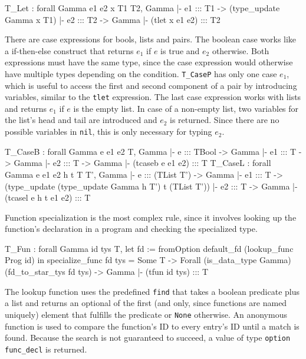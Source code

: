 \documentclass[paper = a4, fleqn, twoside]{scrreprt}
\newcommand{\coqinline}[1]{\texttt{#1}}
\begin{document}
\begin{coqcode}
T_Let : forall Gamma e1 e2 x T1 T2,
          Gamma |- e1 ::: T1 -> (type_update Gamma x T1) |- e2 ::: T2 ->
          Gamma |- (tlet x e1 e2) ::: T2
\end{coqcode}
There are case expressions for bools, lists and pairs. The boolean case works like a if-then-else construct that returns $e_{1}$ if $e$ is true and $e_{2}$ otherwise. Both expressions must have the same type, since the case expression would otherwise have multiple types depending on the condition. \coqinline{T_CaseP} has only one case $e_{1}$, which is useful to access the first and second component of a pair by introducing variables, similar to the \coqinline{tlet} expression. The last case expression works with lists and returns $e_{1}$ if $e$ is the empty list. In case of a non-empty list, two variables for the list's head and tail are introduced and $e_{2}$ is returned. Since there are no possible variables in \coqinline{nil}, this is only necessary for typing $e_{2}$.
\begin{coqcode}
T_CaseB : forall Gamma e e1 e2 T,
            Gamma |- e ::: TBool -> Gamma |- e1 ::: T -> Gamma |- e2 ::: T ->
            Gamma |- (tcaseb e e1 e2) ::: T
T_CaseL : forall Gamma e e1 e2 h t T T',
            Gamma |- e ::: (TList T') -> Gamma |- e1 ::: T ->
            (type_update (type_update Gamma h T') t (TList T')) |- e2 ::: T ->
            Gamma |- (tcasel e h t e1 e2) ::: T
\end{coqcode}
Function specialization is the most complex rule, since it involves looking up the function's declaration in a program and checking the specialized type.
\begin{coqcode}
T_Fun : forall Gamma id tys T,
          let fd := fromOption default_fd (lookup_func Prog id) in 
          specialize_func fd tys = Some T ->
          Forall (is_data_type Gamma) (fd_to_star_tys fd tys) ->
          Gamma |- (tfun id tys) ::: T
\end{coqcode}
The lookup function uses the predefined \coqinline{find} that takes a boolean predicate plus a list and returns an optional of the first (and only, since functions are named uniquely) element that fulfills the predicate or \coqinline{None} otherwise. An anonymous function is used to compare the function's ID to every entry's ID until a match is found. Because the search is not guaranteed to succeed, a value of type \coqinline{option func_decl} is returned.\\
\par \noindent
\end{document}

